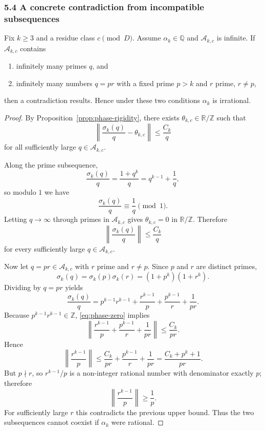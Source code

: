 \subsubsection*{5.4 A concrete contradiction from incompatible subsequences}
\begin{corollary}\label{cor:prime-semiprime}
Fix $k\ge 3$ and a residue class $c\pmod D$. Assume $\alpha_k\in\mathbb{Q}$ and $\mathcal{A}_{k,c}$ is infinite. If $\mathcal{A}_{k,c}$ contains
\begin{enumerate}
\item infinitely many primes $q$, and
\item infinitely many numbers $q=pr$ with a fixed prime $p>k$ and $r$ prime, $r\ne p$,
\end{enumerate}
then a contradiction results. Hence under these two conditions $\alpha_k$ is irrational.
\end{corollary}
\begin{proof}
By Proposition~\ref{prop:phase-rigidity}, there exists $\theta_{k,c}\in\mathbb{R}/\mathbb{Z}$ such that
\[
\left\|\frac{\sigma_k(q)}{q}-\theta_{k,c}\right\|\le \frac{C_k}{q}
\]
for all sufficiently large $q\in\mathcal{A}_{k,c}$.

Along the prime subsequence,
\[
\frac{\sigma_k(q)}{q}=\frac{1+q^k}{q}=q^{k-1}+\frac1q,
\]
so modulo $1$ we have
\[
\frac{\sigma_k(q)}{q}\equiv \frac1q \pmod 1.
\]
Letting $q\to\infty$ through primes in $\mathcal{A}_{k,c}$ gives $\theta_{k,c}=0$ in $\mathbb{R}/\mathbb{Z}$. Therefore
\begin{equation}\label{eq:phase-zero}
\left\|\frac{\sigma_k(q)}{q}\right\|\le \frac{C_k}{q}
\end{equation}
for every sufficiently large $q\in\mathcal{A}_{k,c}$.

Now let $q=pr\in\mathcal{A}_{k,c}$ with $r$ prime and $r\ne p$. Since $p$ and $r$ are distinct primes,
\[
\sigma_k(q)=\sigma_k(p)\sigma_k(r)=(1+p^k)(1+r^k).
\]
Dividing by $q=pr$ yields
\[
\frac{\sigma_k(q)}{q}=p^{k-1}r^{k-1}+\frac{r^{k-1}}{p}+\frac{p^{k-1}}{r}+\frac{1}{pr}.
\]
Because $p^{k-1}r^{k-1}\in\mathbb{Z}$, \eqref{eq:phase-zero} implies
\[
\left\|\frac{r^{k-1}}{p}+\frac{p^{k-1}}{r}+\frac{1}{pr}\right\|\le \frac{C_k}{pr}.
\]
Hence
\[
\left\|\frac{r^{k-1}}{p}\right\|\le \frac{C_k}{pr}+\frac{p^{k-1}}{r}+\frac{1}{pr}
=\frac{C_k+p^k+1}{pr}.
\]
But $p\nmid r$, so $r^{k-1}/p$ is a non-integer rational number with denominator exactly $p$; therefore
\[
\left\|\frac{r^{k-1}}{p}\right\|\ge \frac1p.
\]
For sufficiently large $r$ this contradicts the previous upper bound. Thus the two subsequences cannot coexist if $\alpha_k$ were rational.
\end{proof}


